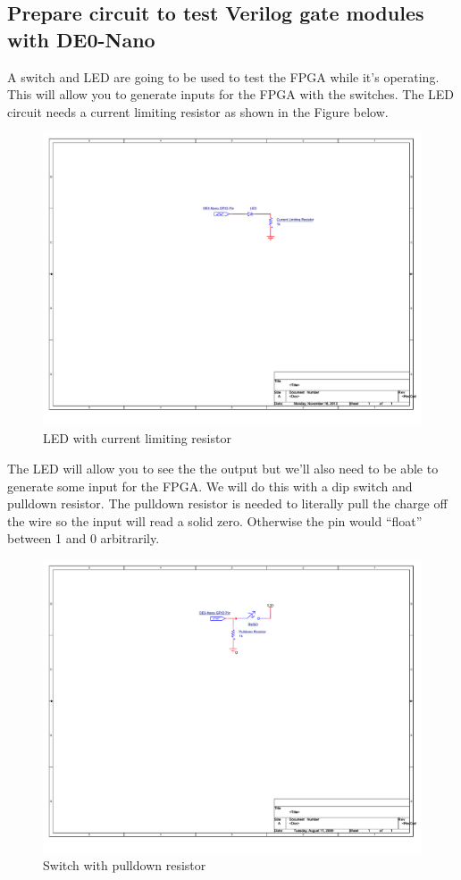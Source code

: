 \documentclass[12pt,journal]{IEEEtran}
\begin{document}
    \subsection{\bfseries Prepare circuit to test Verilog gate modules with DE0-Nano}
      A switch and LED are going to be used to test the FPGA while it's operating. This will allow you to generate
      inputs for the FPGA with the switches. The LED circuit needs a current limiting resistor as shown in the 
      Figure below.
      \begin{figure}[H]
        \label{LEDCircuit}
        \includegraphics[width=.48\textwidth]{Schematics/LED.pdf}
        \caption{LED with current limiting resistor}
      \end{figure}
      The LED will allow you to see the the output but we'll also need to be able to generate some input for
      the FPGA. We will do this with a dip switch and pulldown resistor. The pulldown resistor is needed
      to literally pull the charge off the wire so the input will read a solid zero. Otherwise the pin would ``float''
      between 1 and 0 arbitrarily.
      \begin{figure}[H]
        \label{swPulldown}
        \includegraphics[width=.48\textwidth]{Schematics/SwitchCircuit.pdf}
        \caption{Switch with pulldown resistor}
      \end{figure}

\end{document}
